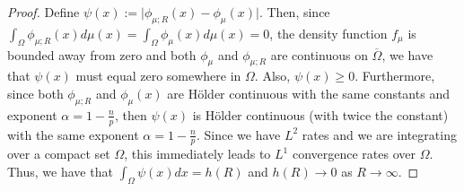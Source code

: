 \documentclass{amsart}
\theoremstyle{lemma}
\theoremstyle{remark}
\begin{document}
\begin{proof}
Define $\psi(x) := \vert \phi_{\mu;R}(x) - \phi_{\mu}(x) \vert$. Then, since $\int_{\Omega} \phi_{\mu;R}(x)d\mu(x) = \int_{\Omega} \phi_{\mu}(x) d\mu(x) = 0$, the density function $f_{\mu}$ is bounded away from zero and both $\phi_{\mu}$ and $\phi_{\mu;R}$ are continuous on $\overline{\Omega}$, we have that $\psi(x)$ must equal zero somewhere in $\Omega$. Also, $\psi(x) \geq 0$. Furthermore, since both $\phi_{\mu;R}$ and $\phi_{\mu}(x)$ are H\"{o}lder continuous with the same constants and exponent $\alpha = 1 - \frac{n}{p}$, then $\psi(x)$ is H\"{o}lder continuous (with twice the constant) with the same exponent $\alpha = 1 - \frac{n}{p}$. Since we have $L^2$ rates and we are integrating over a compact set $\Omega$, this immediately leads to $L^1$ convergence rates over $\Omega$. Thus, we have that $\int_{\Omega} \psi(x)dx = h(R)$ and $h(R) \rightarrow 0$ as $R \rightarrow \infty$.


\end{proof}
\end{document}
